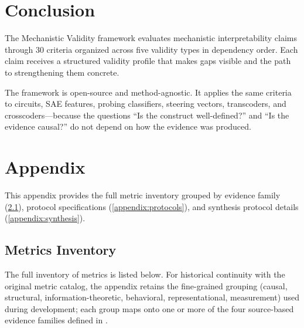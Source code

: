 \documentclass{article}
\begin{document}
\section{Conclusion}
\label{sec:conclusion}

The Mechanistic Validity framework evaluates mechanistic interpretability claims through 30 criteria organized across five validity types in dependency order. Each claim receives a structured validity profile that makes gaps visible and the path to strengthening them concrete.

The framework is open-source and method-agnostic. It applies the same criteria to circuits, SAE features, probing classifiers, steering vectors, transcoders, and crosscoders---because the questions ``Is the construct well-defined?'' and ``Is the evidence causal?'' do not depend on how the evidence was produced.

%
%



\nocite{campbell1963experimental,loevinger1957objective}



\clearpage
\appendix
\section{Appendix}

This appendix provides the full metric inventory grouped by evidence family (\ref{appendix:metrics}), protocol specifications (\ref{appendix:protocols}), and synthesis protocol details (\ref{appendix:synthesis}).

\subsection{Metrics Inventory}
\label{appendix:metrics}
The full inventory of metrics is listed below. For historical continuity with the original metric catalog, the appendix retains the fine-grained grouping (causal, structural, information-theoretic, behavioral, representational, measurement) used during development; each group maps onto one or more of the four source-based evidence families defined in . \\
\\
\begingroup
\small
\setlength{\tabcolsep}{4pt}
\renewcommand{\arraystretch}{1.15}
\end{document}

